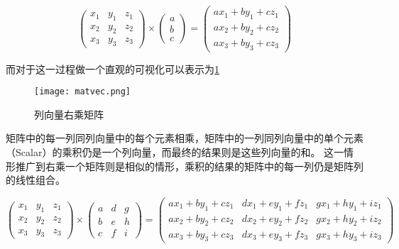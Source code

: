 \begin{equation}
  \begin{pmatrix}
    x_1 & y_1 & z_1\\
    x_2 & y_2 & z_2\\  
    x_3 & y_3 & z_3
  \end{pmatrix}
  \times 
  \begin{pmatrix}
    a \\
    b \\
    c
  \end{pmatrix}
  = 
  \begin{pmatrix}
    ax_1 + by_1 + cz_1\\
    ax_2 + by_2 + cz_2\\  
    ax_3 + by_3 + cz_3
  \end{pmatrix}
\end{equation}

而对于这一过程做一个直观的可视化可以表示为\ref{fig:matvec}

\begin{figure}
\centering
\texttt{[image: matvec.png]}
\caption{列向量右乘矩阵}
\label{fig:matvec}
\end{figure}

矩阵中的每一列同列向量中的每个元素相乘，矩阵中的一列同列向量中的单个元素（Scalar）的乘积仍是一个列向量，而最终的结果则是这些列向量的和。
这一情形推广到右乘一个矩阵则是相似的情形，乘积的结果的矩阵中的每一列仍是矩阵列的线性组合。

\begin{equation}
  \begin{pmatrix}
    x_1 & y_1 & z_1\\
    x_2 & y_2 & z_2\\  
    x_3 & y_3 & z_3
  \end{pmatrix}
  \times 
  \begin{pmatrix}
    a & d & g\\
    b & e & h\\
    c & f & i
  \end{pmatrix}
  = 
  \begin{pmatrix}
    ax_1 + by_1 + cz_1 & dx_1 + ey_1 + fz_1 & gx_1 + hy_1 + iz_1 \\
    ax_2 + by_2 + cz_2 & dx_2 + ey_2 + fz_2 & gx_2 + hy_2 + iz_2 \\
    ax_3 + by_3 + cz_3 & dx_3 + ey_3 + fz_3 & gx_3 + hy_3 + iz_3
  \end{pmatrix}
\end{equation}

